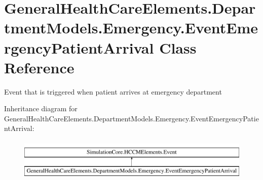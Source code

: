 \hypertarget{class_general_health_care_elements_1_1_department_models_1_1_emergency_1_1_event_emergency_patient_arrival}{}\section{General\+Health\+Care\+Elements.\+Department\+Models.\+Emergency.\+Event\+Emergency\+Patient\+Arrival Class Reference}
\label{class_general_health_care_elements_1_1_department_models_1_1_emergency_1_1_event_emergency_patient_arrival}


Event that is triggered when patient arrives at emergency department  


Inheritance diagram for General\+Health\+Care\+Elements.\+Department\+Models.\+Emergency.\+Event\+Emergency\+Patient\+Arrival\+:\begin{figure}[H]
\begin{center}
\leavevmode
\includegraphics[height=2.000000cm]{class_general_health_care_elements_1_1_department_models_1_1_emergency_1_1_event_emergency_patient_arrival}
\end{center}
\end{figure}
